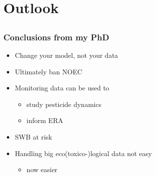 \documentclass[12pt
, t
]{beamer}
\begin{document}
\section{Outlook}
\subsection{}

\begin{frame}
\frametitle{Conclusions from my PhD}
\begin{itemize}
\item Change your model, not your data
\pause
\item Ultimately ban NOEC
\pause
\item Monitoring data can be used to 
		\begin{itemize}
			\item study pesticide dynamics
			\item inform ERA
		\end{itemize}
\pause
\item SWB at risk 
\pause
\item Handling big eco(toxico-)logical data not easy 
		\begin{itemize}
			\item now easier
		\end{itemize}
\end{itemize}
\end{frame}


\begin{frame}[plain]
\end{frame}
\end{document}
